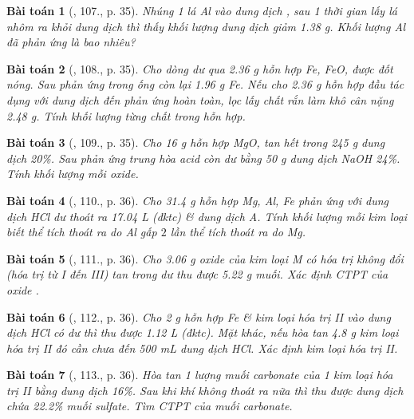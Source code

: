 \documentclass{article}
\newtheorem{baitoan}{Bài toán}
\begin{document}
\begin{baitoan}[\cite{An_400_BT_Hoa_Hoc_9}, 107., p. 35]
	Nhúng 1 lá {\rm Al} vào dung dịch {\rm{}}, sau 1 thời gian lấy lá nhôm ra khỏi dung dịch thì thấy khối lượng dung dịch giảm {\rm1.38 g}. Khối lượng {\rm Al} đã phản ứng là bao nhiêu?
\end{baitoan}

\begin{baitoan}[\cite{An_400_BT_Hoa_Hoc_9}, 108., p. 35]
	Cho dòng {\rm{}} dư qua {\rm2.36 g} hỗn hợp {\rm Fe, FeO, } được đốt nóng. Sau phản ứng trong ống còn lại {\rm1.96 g Fe}. Nếu cho {\rm2.36 g} hỗn hợp đầu tác dụng với dung dịch {\rm{}} đến phản ứng hoàn toàn, lọc lấy chất rắn làm khô cân nặng {\rm2.48 g}. Tính khối lượng từng chất trong hỗn hợp.
\end{baitoan}

\begin{baitoan}[\cite{An_400_BT_Hoa_Hoc_9}, 109., p. 35]
	Cho {\rm16 g} hỗn hợp {\rm MgO, } tan hết trong {\rm245 g} dung dịch {\rm{} 20\%}. Sau phản ứng trung hòa acid còn dư bằng {\rm50 g} dung dịch {\rm NaOH 24\%}. Tính khối lượng mỗi oxide.
\end{baitoan}

\begin{baitoan}[\cite{An_400_BT_Hoa_Hoc_9}, 110., p. 36]
	Cho {\rm31.4 g} hỗn hợp {\rm Mg, Al, Fe} phản ứng với dung dịch {\rm HCl} dư thoát ra {\rm17.04 L } (đktc) \& dung dịch A. Tính khối lượng mỗi kim loại biết thể tích {\rm{}} thoát ra do {\rm Al} gấp $2$ lần thể tích {\rm{}} thoát ra do {\rm Mg}.
\end{baitoan}

\begin{baitoan}[\cite{An_400_BT_Hoa_Hoc_9}, 111., p. 36]
	Cho {\rm3.06 g} oxide {\rm{}} của kim loại M có hóa trị không đổi (hóa trị từ I đến III) tan trong {\rm{}} dư thu được {\rm5.22 g} muối. Xác định {\rm CTPT} của oxide {\rm{}}.
\end{baitoan}

\begin{baitoan}[\cite{An_400_BT_Hoa_Hoc_9}, 112., p. 36]
	Cho {\rm2 g} hỗn hợp {\rm Fe} \& kim loại hóa trị II vào dung dịch {\rm HCl} có dư thì thu được {\rm1.12 L } (đktc). Mặt khác, nếu hòa tan {\rm4.8 g} kim loại hóa trị II đó cần chưa đến {\rm500 mL} dung dịch {\rm HCl}. Xác định kim loại hóa trị II.
\end{baitoan}

\begin{baitoan}[\cite{An_400_BT_Hoa_Hoc_9}, 113., p. 36]
	Hòa tan 1 lượng muối carbonate của 1 kim loại hóa trị II bằng dung dịch {\rm{} 16\%}. Sau khi khí không thoát ra nữa thì thu được dung dịch chứa {\rm22.2\%} muối sulfate. Tìm {\rm CTPT} của muối carbonate.
\end{baitoan}
\end{document}
